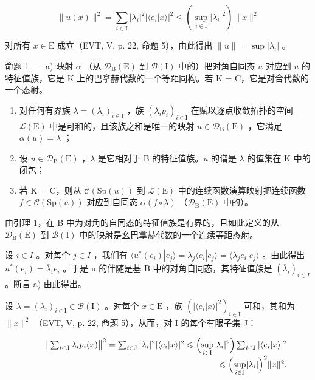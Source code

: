\[
\| u (x) \| ^ {2} = \sum_ {i \in \mathrm{I}} | \lambda_ {i} | ^ {2} | \langle e _ {i} | x \rangle | ^ {2} \leqslant \left(\sup _ {i \in \mathrm{I}} | \lambda_ {i} | ^ {2}\right) \| x \| ^ {2}
\]

对所有 \(x \in \mathrm{E}\) 成立（EVT, V, p. 22, 命题 5），由此得出 \(\| u\| = \sup |\lambda_i|\) 。

命题 1. --- a) 映射 \(\alpha\) （从 \(\mathcal{D}_{\mathrm{B}}(\mathrm{E})\) 到 \(\mathcal{B}(\mathrm{I})\) 中的）把对角自同态 \(u\) 对应到 \(u\) 的特征值族，它是 K 上的巴拿赫代数的一个等距同构。若 K = C，它是对合代数的一个态射。

\begin{enumerate}
\def\labelenumi{\alph{enumi})}
\setcounter{enumi}{1}
\item
  对任何有界族 \(\lambda = (\lambda_i)_{i\in \mathrm{I}}\) ，族 \((\lambda_ip_i)_{i\in \mathrm{I}}\) 在赋以逐点收敛拓扑的空间 \(\mathcal{L}(\mathrm{E})\) 中是可和的，且该族之和是唯一的映射 \(u\in \mathcal{D}_{\mathrm{B}}(\mathrm{E})\) ，它满足 \(\alpha (u) = \lambda\) ；
\item
  设 \(u \in \mathcal{D}_{\mathrm{B}}(\mathrm{E})\) ，\(\lambda\) 是它相对于 B 的特征值族。\(u\) 的谱是 \(\lambda\) 的值集在 K 中的闭包；
\item
  若 K = C，则从 \(\mathcal{C}(\mathrm{Sp}(u))\) 到 \(\mathcal{L}(\mathrm{E})\) 中的连续函数演算映射把连续函数 \(f \in \mathcal{C}(\mathrm{Sp}(u))\) 对应到自同态 \(\alpha(f \circ \lambda)\) （\(\mathcal{D}_{\mathrm{B}}(\mathrm{E})\) 中的）。
\end{enumerate}

由引理 1，在 B 中为对角的自同态的特征值族是有界的，且如此定义的从 \(\mathcal{D}_{\mathrm{B}}(\mathrm{E})\) 到 \(\mathcal{B}(\mathrm{I})\) 中的映射是幺巴拿赫代数的一个连续等距态射。

设 \(i \in I\) 。对每个 \(j \in I\) ，我们有 \(\langle u^{*}(e_{i}) | e_{j} \rangle = \lambda_{j} \langle e_{i} | e_{j} \rangle = \langle \overline{\lambda_{j}} e_{i} | e_{j} \rangle\) 。由此得出 \(u^{*}(e_{i}) = \overline{\lambda}_{i} e_{i}\) 。于是 u 的伴随是基 B 中的对角自同态，其特征值族是 \((\overline{\lambda}_{i})_{i \in I}\) 。断言 a) 由此得出。

设 \(\lambda = (\lambda_i)_{i\in \mathrm{I}}\in \mathcal{B}(\mathrm{I})\) 。对每个 \(x\in \mathrm{E}\) ，族 \((|\langle e_i|x\rangle |^2)_{i\in \mathrm{I}}\) 可和，其和为 \(\| x\|^2\) （EVT, V, p. 22, 命题 5），从而，对 I 的每个有限子集 J：

\[
\begin{array}{r l r} & & {\left\| \sum_ {i \in \mathrm{J}} \lambda_ {i} p _ {i} (x) \right\| ^ {2} = \sum_ {i \in \mathrm{J}} | \lambda_ {i} | ^ {2} | \langle e _ {i} | x \rangle | ^ {2} \leqslant \Bigl (\underset {i \in \mathrm{I}} {\sup} | \lambda_ {i} | ^ {2} \Bigr) \sum_ {i \in \mathrm{J}} | \langle e _ {i} | x \rangle | ^ {2}} \\ & & {\leqslant \Bigl (\underset {i \in \mathrm{I}} {\sup} | \lambda_ {i} | \Bigr) ^ {2} \| x \| ^ {2}.} \end{array}
\]

